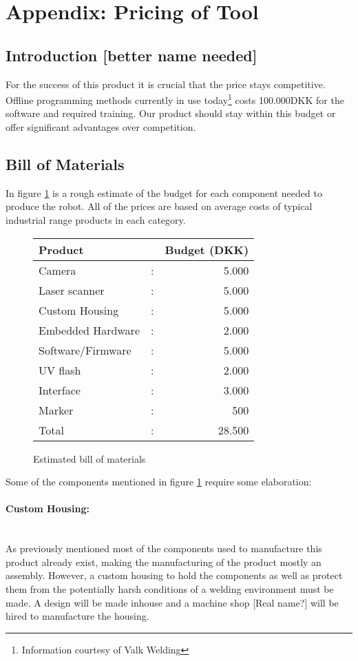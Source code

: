 
\section{Appendix: Pricing of Tool}
\subsection{Introduction [better name needed]}
For the success of this product it is crucial that the price stays competitive. Offline programming methods currently in use today\footnote{Information courtesy of Valk Welding} costs 100.000DKK for the software and required training. Our product should stay within this budget or offer significant advantages over competition.
\subsection{Bill of Materials}
In figure \ref{tab:BoM} is a rough estimate of the budget for each component needed to produce the robot. All of the prices are based on average costs of typical industrial range products in each category.  
\begin{figure}[h!]
	\begin{center}
		\begin{tabular}{l c r}
		Product            & & Budget (DKK)\\
		\hline
		Camera 				& : & 5.000  \\
		Laser scanner		& : & 5.000 \\
		Custom Housing		& : & 5.000\\
		Embedded Hardware	& : & 2.000\\
		Software/Firmware	& : & 5.000\\
		UV flash			& : & 2.000\\
		Interface			& : & 3.000\\
		Marker				& : & 500\\[0.2cm]
		\hline
		Total				& : & 28.500\\ 
		\end{tabular}
	\end{center}
	\caption{Estimated bill of materials}
\label{tab:BoM}
\end{figure}
Some of the components mentioned in figure \ref{tab:BoM} require some elaboration:
\paragraph{Custom Housing:}~\\
As previously mentioned most of the components used to manufacture this product already exist, making the manufacturing of the product mostly an assembly. However, a custom housing to hold the components as well as protect them from the potentially harsh conditions of a welding environment must be made. A design will be made inhouse and a machine shop [Real name?] will be hired to manufacture the housing.

